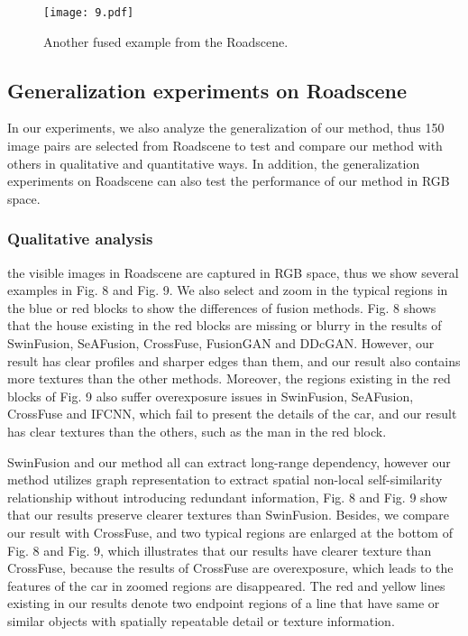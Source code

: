 \documentclass[journal]{IEEEtran}
\begin{document}
\begin{figure}[!t]
\centering
\texttt{[image: 9.pdf]}
\caption{Another fused example from the Roadscene.}
\label{FIG:9}
\end{figure}

\subsection{Generalization experiments on Roadscene}
In our experiments, we also analyze the generalization of our method, thus 150 image pairs are selected from Roadscene to test and compare our method with others in qualitative and quantitative ways. In addition, the generalization experiments on Roadscene can also test the performance of our method in RGB space.

\subsubsection{Qualitative analysis}
the visible images in Roadscene are captured in RGB space, thus we show several examples in Fig. 8 and Fig. 9. We also select and zoom in the typical regions in the blue or red blocks to show the differences of fusion methods. Fig. 8 shows that the house existing in the red blocks are missing or blurry in the results of SwinFusion, SeAFusion, CrossFuse, FusionGAN and DDcGAN. However, our result has clear profiles and sharper edges than them, and our result also contains more textures than the other methods. Moreover, the regions existing in the red blocks of Fig. 9 also suffer overexposure issues in SwinFusion, SeAFusion, CrossFuse and IFCNN, which fail to present the details of the car, and our result has clear textures than the others, such as the man in the red block.

SwinFusion and our method all can extract long-range dependency, however our method utilizes graph representation to extract spatial non-local self-similarity relationship without introducing redundant information, Fig. 8 and Fig. 9 show that our results preserve clearer textures than SwinFusion. Besides, we compare our result with CrossFuse, and two typical regions are enlarged at the bottom of Fig. 8 and Fig. 9, which illustrates that our results have clearer texture than CrossFuse, because the results of CrossFuse are overexposure, which leads to the features of the car in zoomed regions are disappeared. The red and yellow lines existing in our results denote two endpoint regions of a line that have same or similar objects with spatially repeatable detail or texture information.
\end{document}

